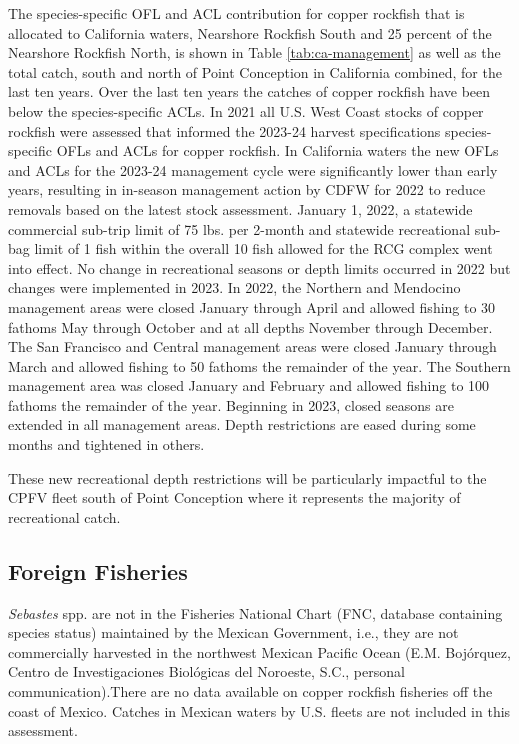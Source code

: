 \documentclass[11pt,
  english,
  letterpaper,
]{article}
\begin{document}
The species-specific OFL and ACL contribution for copper rockfish that is allocated to California waters, Nearshore Rockfish South and 25 percent of the Nearshore Rockfish North, is shown in Table \ref{tab:ca-management} as well as the total catch, south and north of Point Conception in California combined, for the last ten years. Over the last ten years the catches of copper rockfish have been below the species-specific ACLs. In 2021 all U.S. West Coast stocks of copper rockfish were assessed that informed the 2023-24 harvest specifications species-specific OFLs and ACLs for copper rockfish. In California waters the new OFLs and ACLs for the 2023-24 management cycle were significantly lower than early years, resulting in in-season management action by CDFW for 2022 to reduce removals based on the latest stock assessment. January 1, 2022, a statewide commercial sub-trip limit of 75 lbs. per 2-month and statewide recreational sub-bag limit of 1 fish within the overall 10 fish allowed for the RCG complex went into effect. No change in recreational seasons or depth limits occurred in 2022 but changes were implemented in 2023. In 2022, the Northern and Mendocino management areas were closed January through April and allowed fishing to 30 fathoms May through October and at all depths November through December. The San Francisco and Central management areas were closed January through March and allowed fishing to 50 fathoms the remainder of the year. The Southern management area was closed January and February and allowed fishing to 100 fathoms the remainder of the year. Beginning in 2023, closed seasons are extended in all management areas. Depth restrictions are eased during some months and tightened in others.

These new recreational depth restrictions will be particularly impactful to the CPFV fleet south of Point Conception where it represents the majority of recreational catch.

\hypertarget{foreign-fisheries}{%
\subsection{Foreign Fisheries}\label{foreign-fisheries}}

\emph{Sebastes} spp. are not in the Fisheries National Chart (FNC, database containing species status) maintained by the Mexican Government, i.e., they are not commercially harvested in the northwest Mexican Pacific Ocean (E.M. Bojórquez, Centro de Investigaciones Biológicas del Noroeste, S.C., personal communication).There are no data available on copper rockfish fisheries off the coast of Mexico. Catches in Mexican waters by U.S. fleets are not included in this assessment.
\end{document}
